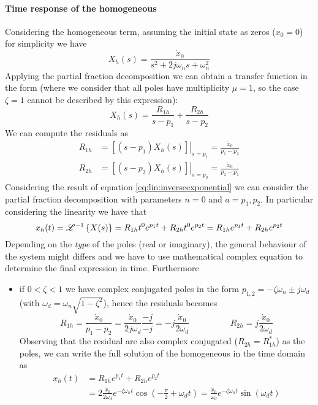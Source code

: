 		\paragraph{Time response of the homogeneous} Considering the homogeneous term, assuming the initial state as zeros ($x_0 = 0$) for simplicity we have
		\[ X_h(s) = \frac{ \dot x_0}{s^2 + 2 j\omega_ns + \omega_n^2} \]
		Applying the partial fraction decomposition we can obtain a transfer function in the form (where we consider that all poles have multiplicity $\mu =1$, so the case $\zeta = 1$ cannot be described by this expression):
		\[ X_h(s) = \frac{R_{1h}}{s-p_1} + \frac{R_{2h}}{s-p_2} \]
		We can compute the residuals as
		\begin{align*}
			R_{1h} & = \left.\left[ (s-p_1) X_h(s)\right] \right|_{s=p_1} = \frac{\dot x_0}{p_1-p_2} \\
			R_{2h} & = \left.\left[ (s-p_2) X_h(s)\right] \right|_{s=p_2} = \frac{\dot x_0}{p_2-p_1} 		
		\end{align*}
		Considering the result of equation \ref{eq:lin:inverseexponential} we can consider the partial fraction decomposition with parameters $n=0$ and $a = p_1,p_2$. In particular considering the linearity we have that
		\[ x_h(t) = \mathscr L^{-1} \left\{ X(s) \right\} = R_{1h} t^0 e^{p_1t} + R_{2h} t^0 e^{p_2t} = R_{1h} e^{p_1t} + R_{2h} e^{p_2t}  \]
		Depending on the \textit{type} of the poles (real or imaginary), the general behaviour of the system might differs and we have to use mathematical complex equation to determine the final expression in time. Furthermore
		\begin{itemize}
			\item if $0 < \zeta < 1$ we have complex conjugated poles in the form $p_{1,2} = -\zeta \omega_n \pm j\omega_d$ (with $\omega_d = \omega_n\sqrt{1-\zeta^2}$), hence the residuals becomes
			\[ R_{1h} = \frac{\dot x_0}{p_1-p_2} = \frac{\dot x_0}{2j \omega_d} \frac{-j}{-j} = - j \frac{\dot x_0}{2\omega_d}  \hspace{2cm} R_{2h} = j \frac{\dot x_0}{2\omega_d} \]
			Observing that the residual are also complex conjugated ($R_{2h} = R_{1h}^*$) as the poles, we can write the full solution of the homogeneous in the time domain as
			\begin{equation}
			\begin{aligned}
				x_h(t) & = R_{1h} e^{p_1t} + R_{2h} e^{p_2t} \\
				& = 2 \frac{\dot x_0}{2\omega_d} e^{-\zeta \omega_n t} \cos\left( -\frac \pi 2 + \omega_d t \right) = \frac{\dot x_0}{\omega_d} e^{-\zeta \omega_n t} \sin\left( \omega_d t \right)
			\end{aligned}
			\end{equation}
		\end{itemize}
	
	
	
	
